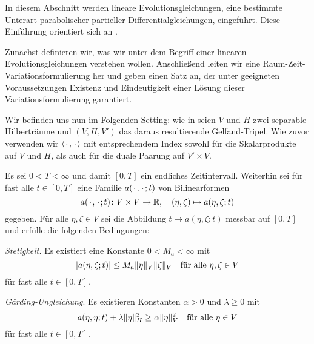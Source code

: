 In diesem Abschnitt werden lineare Evolutionsgleichungen, eine bestimmte Unterart parabolischer partieller Differentialgleichungen, eingeführt.
Diese Einführung orientiert sich an \textcite{Lions:1971wp,Schwab:2009ec,Urban:2014kg}.

Zunächst definieren wir, was wir unter dem Begriff einer linearen Evolutionsgleichungen verstehen wollen.
Anschließend leiten wir eine Raum-Zeit-Variationsformulierung her und geben einen Satz an, der unter geeigneten Voraussetzungen Existenz und Eindeutigkeit einer Lösung dieser Variationsformulierung garantiert.

Wir befinden uns nun im Folgenden Setting:
wie in  seien $V$ und $H$ zwei separable Hilberträume und $(V, H, V')$ das daraus resultierende Gelfand-Tripel.
Wie zuvor verwenden wir $\left\langle{\mkern2mu\cdot\mkern2mu},{\mkern2mu\cdot\mkern2mu}\right\rangle$ mit entsprechendem Index sowohl für die Skalarprodukte auf $V$ und $H$, als auch für die duale Paarung auf $V' \times V$.

Es sei $0 < T < \infty$ und damit $[0, T]$ ein endliches Zeitintervall.
Weiterhin sei für fast alle $t \in [0, T]$ eine Familie $a({\mkern2mu\cdot\mkern2mu}, {\mkern2mu\cdot\mkern2mu}; t)$ von Bilinearformen
\begin{equation}
    \label{eq:gl:familie_bf_a}
    a(\blank, \blank; t) \colon V \times V \to \mathbb{R}, \quad (\eta, \zeta) \mapsto a(\eta, \zeta; t)
\end{equation}
gegeben.
Für alle $\eta, \zeta \in V$ sei die Abbildung $t \mapsto a(\eta, \zeta; t)$ messbar auf $[0, T]$ und erfülle die folgenden Bedingungen:

\begin{Annahme}
\label{annahme:eigenschaften_bf_a}
    \leavevmode
    \begin{thmenumerate}
        \item \emph{Stetigkeit.}
        Es existiert eine Konstante $0 < M_{a} < \infty$ mit
        \begin{equation}
            \label{eq:allgemeine_parabolische_pde:bf_stetig}
            \abs{a(\eta, \zeta; t)} \leq M_{a} \norm{\eta}_{V} \norm{\zeta}_{V} \quad \fa \eta, \zeta \in V
        \end{equation}
        für fast alle $t \in [0, T]$.
        \item \emph{G\r{a}rding-Ungleichung}.
        Es existieren Konstanten $\alpha > 0$ und $\lambda \geq 0$ mit
        \begin{equation}
            \label{eq:allgemeine_parabolische_pde:bf_garding}
            a(\eta, \eta; t) + \lambda \norm{\eta}_{H}^{2} \geq \alpha \norm{\eta}_{V}^{2} \quad \fa \eta \in V
        \end{equation}
        für fast alle $t \in [0, T]$.
    \end{thmenumerate}
\end{Annahme}

